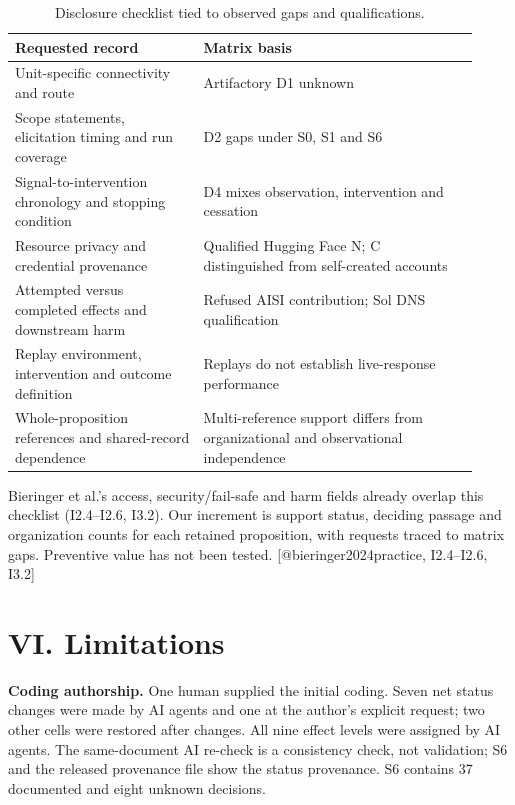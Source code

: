 \documentclass[conference]{IEEEtran}
\begin{document}
\begin{table}[t]\centering\small
\setlength{\tabcolsep}{4pt}
\caption{Disclosure checklist tied to observed gaps and qualifications.}
\begin{tabular}{>{\raggedright\arraybackslash}p{0.377\linewidth}>{\raggedright\arraybackslash}p{0.543\linewidth}}
\toprule
Requested record & Matrix basis \\
\midrule
Unit-specific connectivity and route & Artifactory D1 unknown \\
Scope statements, elicitation timing and run coverage & D2 gaps under S0, S1 and S6 \\
Signal-to-intervention chronology and stopping condition & D4 mixes observation, intervention and cessation \\
Resource privacy and credential provenance & Qualified Hugging Face N; C distinguished from self-created accounts \\
Attempted versus completed effects and downstream harm & Refused AISI contribution; Sol DNS qualification \\
Replay environment, intervention and outcome definition & Replays do not establish live-response performance \\
Whole-proposition references and shared-record dependence & Multi-reference support differs from organizational and observational independence \\
\bottomrule
\end{tabular}
\end{table}

Bieringer et al.'s access, security/fail-safe and harm fields already overlap this checklist (I2.4--I2.6, I3.2). Our increment is support status, deciding passage and organization counts for each retained proposition, with requests traced to matrix gaps. Preventive value has not been tested. [@bieringer2024practice, I2.4--I2.6, I3.2]

\section{VI. Limitations}

\textbf{Coding authorship.} One human supplied the initial coding. Seven net status changes were made by AI agents and one at the author's explicit request; two other cells were restored after changes. All nine effect levels were assigned by AI agents. The same-document AI re-check is a consistency check, not validation; S6 and the released provenance file show the status provenance. S6 contains 37 documented and eight unknown decisions.
\end{document}
